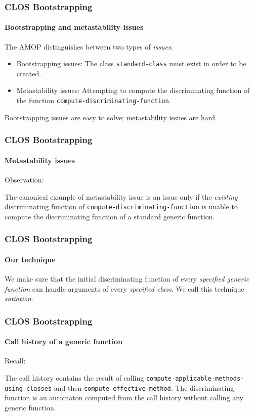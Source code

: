 \documentclass[12pt]{beamer}
\begin{document}
\begin{frame}
  \frametitle{CLOS Bootstrapping}
  \framesubtitle{Bootstrapping and metastability issues}

The AMOP distinguishes between two types of \emph{issues}:
\vskip 0.5cm
\begin{itemize}
\item Bootstrapping issues: The class \texttt{standard-class} must exist in
  order to be created.
\item Metastability issues: Attempting to compute the discriminating function
  of the function \texttt{compute-discriminating-function}.
\end{itemize}

Bootstrapping issues are easy to solve; metastability issues are hard.

\end{frame}
\begin{frame}
  \frametitle{CLOS Bootstrapping}
  \framesubtitle{Metastability issues}

Observation:
\vskip 0.5cm

The canonical example of metastability issue is an issue only if the
\emph{existing} discriminating function of
\texttt{compute-discriminating-function} is unable to compute the
discriminating function of a standard generic function.

\end{frame}
\begin{frame}
  \frametitle{CLOS Bootstrapping}
  \framesubtitle{Our technique}

We make sure that the initial discriminating function of every
\emph{specified generic function} can handle arguments of every
\emph{specified class}.
\vskip 0.5cm
We call this technique \emph{satiation}.

\end{frame}
\begin{frame}
  \frametitle{CLOS Bootstrapping}
  \framesubtitle{Call history of a generic function}

Recall:
\vskip 0.5cm

The call history contains the result of calling
\texttt{compute-applicable-methods-using-classes} and then
\texttt{compute-effective-method}.
\vskip 0.25cm
The discriminating function is an automaton computed from the call
history without calling any generic function.

\end{frame}
\end{document}
